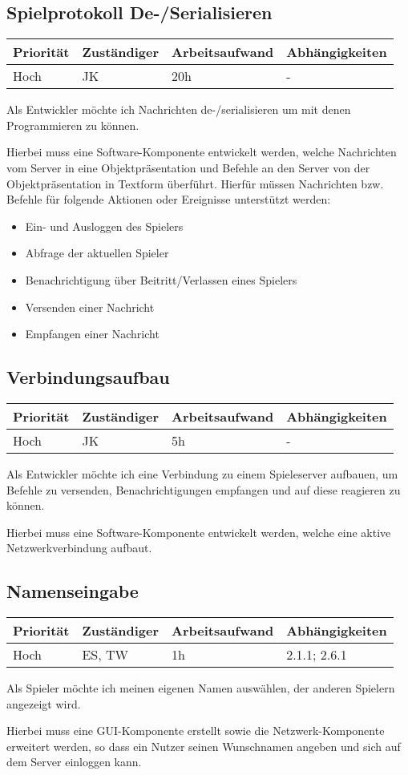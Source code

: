 \documentclass[a4paper]{scrreprt}
\newenvironment{requirement}[5] {
	\subsection{#1}
	\begin{tabularx}{\textwidth}{|X|l|X|X|}
		\hline
		Priorität & Zuständiger & Arbeitsaufwand & Abhängigkeiten \\
		\hline
		#2 & #3 & #4 & #5 \\
		\hline
	\end{tabularx}
	}{
	\newpage
	}
\begin{document}
\begin{requirement}{Spielprotokoll De-/Serialisieren}{Hoch}{JK}{20h}{-}

\begin{center}
	Als Entwickler möchte ich Nachrichten de-/serialisieren um mit denen Programmieren zu können.
\end{center}

Hierbei muss eine Software-Komponente entwickelt werden, welche Nachrichten vom Server in eine Objektpräsentation und Befehle an den Server von der Objektpräsentation in Textform
überführt. Hierfür müssen Nachrichten bzw. Befehle für folgende Aktionen oder Ereignisse unterstützt werden:
\begin{itemize}
	\item Ein- und Ausloggen des Spielers
	\item Abfrage der aktuellen Spieler
	\item Benachrichtigung über Beitritt/Verlassen eines Spielers
	\item Versenden einer Nachricht
	\item Empfangen einer Nachricht
\end{itemize}
\end{requirement}


\begin{requirement}{Verbindungsaufbau}{Hoch}{JK}{5h}{-}

\begin{center}
	Als Entwickler möchte ich eine Verbindung zu einem Spieleserver aufbauen, um Befehle zu versenden, Benachrichtigungen empfangen und auf diese reagieren zu können.
\end{center}

Hierbei muss eine Software-Komponente entwickelt werden, welche eine aktive Netzwerkverbindung aufbaut.

\end{requirement}


\begin{requirement}{Namenseingabe}{Hoch}{ES, TW}{1h}{2.1.1; 2.6.1}

\begin{center}
	Als Spieler möchte ich meinen eigenen Namen auswählen, der anderen Spielern angezeigt wird.
\end{center}

Hierbei muss eine GUI-Komponente erstellt sowie die Netzwerk-Komponente erweitert werden, so dass ein Nutzer seinen Wunschnamen angeben und sich auf dem Server einloggen kann.

\end{requirement}
\end{document}
